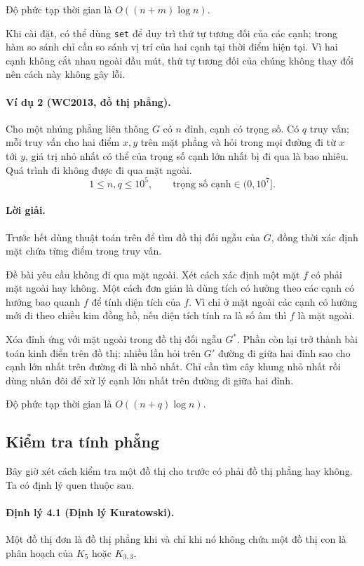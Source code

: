 \documentclass[11pt]{article}
\begin{document}
Độ phức tạp thời gian là $O((n+m)\log n)$.

Khi cài đặt, có thể dùng \texttt{set} để duy trì thứ tự tương đối của các cạnh;
trong hàm so sánh chỉ cần so sánh vị trí của hai cạnh tại thời điểm hiện tại.
Vì hai cạnh không cắt nhau ngoài đầu mút, thứ tự tương đối của chúng không thay
đổi nên cách này không gây lỗi.

\paragraph{Ví dụ 2 (WC2013, đồ thị phẳng).}
Cho một nhúng phẳng liên thông $G$ có $n$ đỉnh, cạnh có trọng số. Có $q$ truy
vấn; mỗi truy vấn cho hai điểm $x,y$ trên mặt phẳng và hỏi trong mọi đường đi
từ $x$ tới $y$, giá trị nhỏ nhất có thể của trọng số cạnh lớn nhất bị đi qua là
bao nhiêu. Quá trình đi không được đi qua mặt ngoài.
\[
  1\le n,q\le 10^5,\qquad \text{trọng số cạnh}\in(0,10^7].
\]

\paragraph{Lời giải.}
Trước hết dùng thuật toán trên để tìm đồ thị đối ngẫu của $G$, đồng thời xác
định mặt chứa từng điểm trong truy vấn.

Đề bài yêu cầu không đi qua mặt ngoài. Xét cách xác định một mặt $f$ có phải
mặt ngoài hay không. Một cách đơn giản là dùng tích có hướng theo các cạnh có
hướng bao quanh $f$ để tính diện tích của $f$. Vì chỉ ở mặt ngoài các cạnh có
hướng mới đi theo chiều kim đồng hồ, nếu diện tích tính ra là số âm thì $f$ là
mặt ngoài.

Xóa đỉnh ứng với mặt ngoài trong đồ thị đối ngẫu $G^*$. Phần còn lại trở thành
bài toán kinh điển trên đồ thị: nhiều lần hỏi trên $G'$ đường đi giữa hai đỉnh
sao cho cạnh lớn nhất trên đường đi là nhỏ nhất. Chỉ cần tìm cây khung nhỏ nhất
rồi dùng nhân đôi để xử lý cạnh lớn nhất trên đường đi giữa hai đỉnh.

Độ phức tạp thời gian là $O((n+q)\log n)$.

\subsection{Kiểm tra tính phẳng}

Bây giờ xét cách kiểm tra một đồ thị cho trước có phải đồ thị phẳng hay không.
Ta có định lý quen thuộc sau.

\paragraph{Định lý 4.1 (Định lý Kuratowski).}
Một đồ thị đơn là đồ thị phẳng khi và chỉ khi nó không chứa một đồ thị con là
phân hoạch của $K_5$ hoặc $K_{3,3}$.
\end{document}
